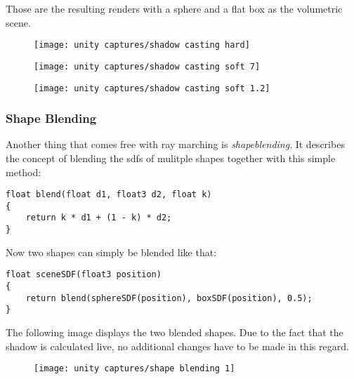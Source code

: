 \noindent
Those are the resulting renders with a sphere and a flat box as the volumetric scene.
\begin{figure}[H]
    \centering
        \begin{minipage}{0.3\linewidth}
            \texttt{[image: unity captures/shadow casting hard]}
            \label{img:captures:shadows:hard}
        \end{minipage}
        \hfill
        \begin{minipage}{0.3\linewidth}
            \texttt{[image: unity captures/shadow casting soft 7]}
            \label{img:captures:shadows:soft2}
        \end{minipage}
        \hfill
        \begin{minipage}{0.3\linewidth}
            \texttt{[image: unity captures/shadow casting soft 1.2]}
            \label{img:captures:shadows:soft1}
        \end{minipage}
\end{figure}

\clearpage
\subsubsection{Shape Blending}
Another thing that comes free with ray marching is \textit{\gls{shapeblending}}. It describes the concept of blending the \gls{sdf}s of mulitple shapes together with this simple method:
\begin{lstlisting}[language=HLSL]
float blend(float d1, float3 d2, float k)
{
    return k * d1 + (1 - k) * d2;
}
\end{lstlisting}

\noindent
Now two shapes can simply be blended like that:
\begin{lstlisting}[language=HLSL]
float sceneSDF(float3 position)
{
    return blend(sphereSDF(position), boxSDF(position), 0.5);
}
\end{lstlisting}

\noindent
The following image displays the two blended shapes. Due to the fact that the shadow is calculated live, no additional changes have to be made in this regard.
\begin{figure}[H]
    \texttt{[image: unity captures/shape blending 1]}
    \label{img:captures:shapeblending1}
\end{figure}

